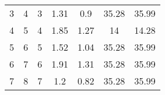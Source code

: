 \begin{table}[]
\begin{tabular}{@{}ccccccc@{}}
3                                                            & 4                                                              & 3                                                     & 1.31                                                                           & 0.9                                                                            & 35.28                                                                               & 35.99                                                                                 \\
4                                                            & 5                                                              & 4                                                     & 1.85                                                                           & 1.27                                                                           & 14                                                                                  & 14.28                                                                                 \\
5                                                            & 6                                                              & 5                                                     & 1.52                                                                           & 1.04                                                                           & 35.28                                                                               & 35.99                                                                                 \\
6                                                            & 7                                                              & 6                                                     & 1.91                                                                           & 1.31                                                                           & 35.28                                                                               & 35.99                                                                                 \\
7                                                            & 8                                                              & 7                                                     & 1.2                                                                            & 0.82                                                                           & 35.28                                                                               & 35.99                                                                                 \\

\end{tabular}
\end{table}
